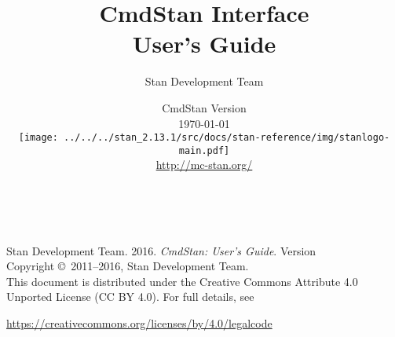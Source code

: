 \title{\Huge\bf CmdStan Interface \\[4pt] {\LARGE User's Guide}}
\author{Stan Development Team}

\date{\vspace*{36pt} CmdStan Version \cmdstanversion
\\[8pt] {\small \today}
\\[36pt]
{
\vfill
\texttt{[image: ../../../stan\_2.13.1/src/docs/stan-reference/img/stanlogo-main.pdf]}}
\\
\vspace*{6pt}
{\small \url{http://mc-stan.org/}}
}
\maketitle

\newpage
\thispagestyle{empty}
\mbox{ }
\vfill
\begin{center}
\begin{minipage}[t]{0.75\textwidth}
\small
Stan Development Team. 2016.
{\it CmdStan: User's Guide}. Version
\cmdstanversion
\vspace*{20pt}
\mbox{ }
\\
Copyright \copyright \ 2011--2016, Stan Development Team.
\vspace*{28pt}
\mbox{} \\
This document is distributed under the Creative Commons Attribute 4.0
Unported License (CC BY 4.0).  For full details, see
\begin{center}
\url{https://creativecommons.org/licenses/by/4.0/legalcode}
\end{center}
\end{minipage}
\vspace*{24pt}
\mbox{ }
\end{center}

